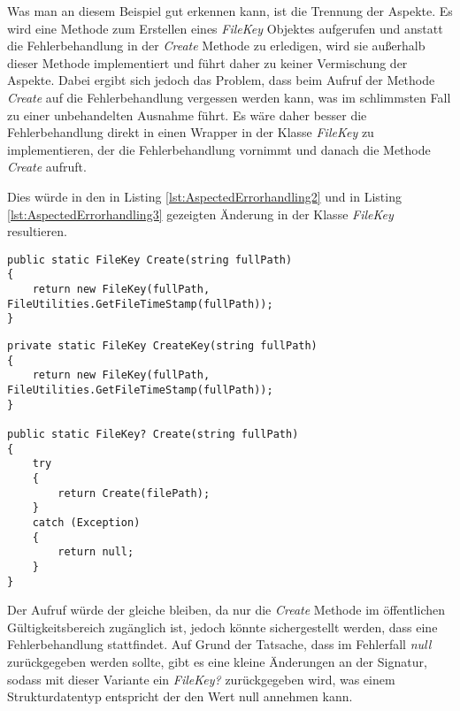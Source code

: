 \SuperPar Was man an diesem Beispiel gut erkennen kann, ist die Trennung der Aspekte. Es wird eine Methode zum Erstellen eines \textit{FileKey} Objektes aufgerufen und anstatt die Fehlerbehandlung in der \textit{Create} Methode zu erledigen, wird sie außerhalb dieser Methode implementiert und führt daher zu keiner Vermischung der Aspekte. Dabei ergibt sich jedoch das Problem, dass beim Aufruf der Methode \textit{Create} auf die Fehlerbehandlung vergessen werden kann, was im schlimmsten Fall zu einer unbehandelten Ausnahme führt. Es wäre daher besser die Fehlerbehandlung direkt in einen Wrapper in der Klasse \textit{FileKey} zu implementieren, der die Fehlerbehandlung vornimmt und danach die Methode \textit{Create} aufruft.

\SuperPar Dies würde in den in Listing \ref{lst:AspectedErrorhandling2} und in Listing \ref{lst:AspectedErrorhandling3} gezeigten Änderung in der Klasse \textit{FileKey} resultieren.

\begin{lstlisting}[language={[Sharp]C}, caption=Fehlerbehandlung in der Klasse FileKey vorher, label=lst:AspectedErrorhandling2]
public static FileKey Create(string fullPath)
{
	return new FileKey(fullPath, FileUtilities.GetFileTimeStamp(fullPath));
}
\end{lstlisting}

\begin{lstlisting}[language={[Sharp]C}, caption=Fehlerbehandlung in der Klasse FileKey nachher, label=lst:AspectedErrorhandling3]
private static FileKey CreateKey(string fullPath)
{
	return new FileKey(fullPath, FileUtilities.GetFileTimeStamp(fullPath));
}
				
public static FileKey? Create(string fullPath)
{
	try
	{
		return Create(filePath);
	}
	catch (Exception)
	{
		return null;
	}
}
\end{lstlisting}

\SuperPar Der Aufruf würde der gleiche bleiben, da nur die \textit{Create} Methode im öffentlichen Gültigkeitsbereich zugänglich ist, jedoch könnte sichergestellt werden, dass eine Fehlerbehandlung stattfindet. Auf Grund der Tatsache, dass im Fehlerfall \textit{null} zurückgegeben werden sollte, gibt es eine kleine Änderungen an der Signatur, sodass mit dieser Variante ein \textit{FileKey?} zurückgegeben wird, was einem Strukturdatentyp entspricht der den Wert null annehmen kann. 

